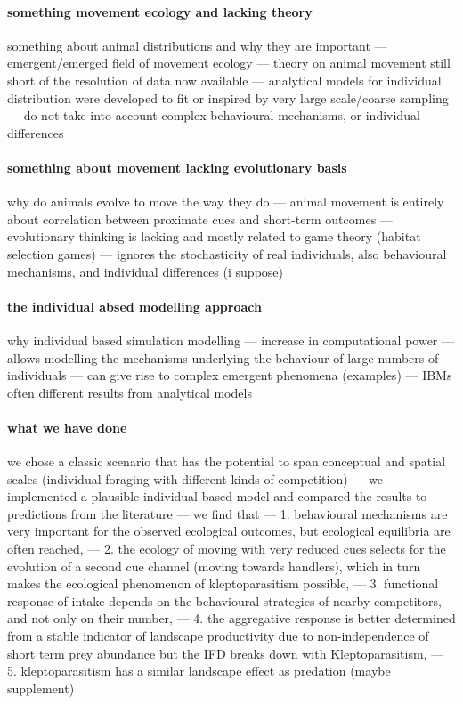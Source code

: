 \documentclass[11pt]{article}
\begin{document}
\paragraph{something movement ecology and lacking theory}

something about animal distributions and why they are important --- emergent/emerged field of movement ecology --- theory on animal movement still short of the resolution of data now available --- analytical models for individual distribution were developed to fit or inspired by very large scale/coarse sampling --- do not take into account complex behavioural mechanisms, or individual differences

\paragraph{something about movement lacking evolutionary basis}

why do animals evolve to move the way they do --- animal movement is entirely about correlation between proximate cues and short-term outcomes --- evolutionary thinking is lacking and mostly related to game theory (habitat selection games) --- ignores the stochasticity of real individuals, also behavioural mechanisms, and individual differences (i suppose)

\paragraph{the individual absed modelling approach}

why individual based simulation modelling --- increase in computational power --- allows modelling the mechanisms underlying the behaviour of large numbers of individuals --- can give rise to complex emergent phenomena (examples) --- IBMs often different results from analytical models

\paragraph{what we have done}

we chose a classic scenario that has the potential to span conceptual and spatial scales (individual foraging with different kinds of competition) --- we implemented a plausible individual based model and compared the results to predictions from the literature --- we find that --- 1. behavioural mechanisms are very important for the observed ecological outcomes, but ecological equilibria are often reached, --- 2. the ecology of moving with very reduced cues selects for the evolution of a second cue channel (moving towards handlers), which in turn makes the ecological phenomenon of kleptoparasitism possible, --- 3. functional response of intake depends on the behavioural strategies of nearby competitors, and not only on their number, --- 4. the aggregative response is better determined from a stable indicator of landscape productivity due to non-independence of short term prey abundance but the IFD breaks down with Kleptoparasitism, --- 5. kleptoparasitism has a similar landscape effect as predation (maybe supplement)
\end{document}
